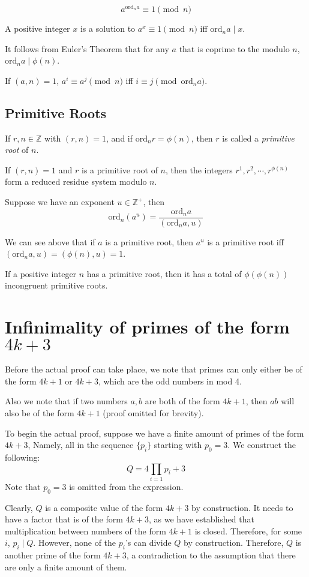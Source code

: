 \documentclass{article}
\begin{document}
\begin{multicols*}{2}
\[a^{\text{ord}_na} \equiv 1 \pmod{n}\]

A positive integer $x$ is a solution to $a^x \equiv 1 \pmod{n}$ iff $\text{ord}_na \mid x$.

It follows from Euler's Theorem that for any $a$ that is coprime to the modulo $n$, $\text{ord}_na \mid \phi(n)$.

If $(a,n) = 1$, $a^i \equiv a^j \pmod{n}$ iff $i \equiv j \pmod{\text{ord}_na}$.

\subsection*{Primitive Roots}

If $r,n \in \mathbb{Z}$ with $(r,n) = 1$, and if $\text{ord}_nr = \phi(n)$, then $r$ is called a \textit{primitive root} of $n$.

If $(r,n) = 1$ and $r$ is a primitive root of $n$, then the integers $r^1,r^2,\cdots,r^{\phi(n)}$ form a reduced residue system modulo $n$.

Suppose we have an exponent $u \in \mathbb{Z}^+$, then \[\text{ord}_n(a^u) = \frac{\text{ord}_na}{(\text{ord}_na, u)}\]

We can see above that if $a$ is a primitive root, then $a^u$ is a primitive root iff $(\text{ord}_na, u) = (\phi(n),u) = 1$.

If a positive integer $n$ has a primitive root, then it has a total of $\phi(\phi(n))$ incongruent primitive roots.

\newpage

\section{Infinimality of primes of the form $4k+3$}

Before the actual proof can take place, we note that primes can only either be of the form $4k+1$ or $4k+3$, which are the odd numbers in mod 4.

Also we note that if two numbers $a, b$ are both of the form $4k +1$, then $ab$ will also be of the form $4k + 1$ (proof omitted for brevity).

To begin the actual proof, suppose we have a finite amount of primes of the form $4k+3$, Namely, all in the sequence $\{p_i\}$ starting with $p_0 = 3$. We construct the following: \[Q = 4\prod_{i=1}{p_i} + 3\]Note that $p_0 = 3$ is omitted from the expression.

Clearly, $Q$ is a composite value of the form $4k+3$ by construction. It needs to have a factor that is of the form $4k+3$, as we have established that multiplication between numbers of the form $4k+1$ is closed. Therefore, for some $i$, $p_i \mid Q$. However, none of the $p_i$'s can divide $Q$ by construction. Therefore, $Q$ is another prime of the form $4k+3$, a contradiction to the assumption that there are only a finite amount of them.

\end{multicols*}
\end{document}
